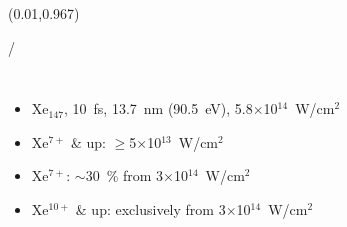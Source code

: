 \documentclass{beamer}
\makeatletter
\newcommand{\framenumber}{
\begin{textblock}{0}(0.01,0.967)
\begin{scriptsize}
{\color{gray}\insertframenumber/\inserttotalframenumber}
\end{scriptsize}
\end{textblock}
}
\makeatother
\begin{document}
\begin{frame}{}
\begin{columns}
\begin{center}
\begin{overlayarea}{\textwidth}{\textheight}
            \end{overlayarea}
        \end{center}

   \end{columns}
\end{frame}
\begin{frame}{}\framenumber{}
   \begin{columns}
       \begin{itemize}
           \item Xe$_{147}$, 10~fs, 13.7~nm (90.5~eV), 5.8$\times$10$^{14}$~W/cm$^2$
           \item<3-> Xe$^{7+}$ \& up: $\ge$5$\times$10$^{13}$~W/cm$^2$
           \item<3-> Xe$^{7+}$: $\sim$30~\% from 3$\times$10$^{14}$~W/cm$^2$
           \item<3-> Xe$^{10+}$ \& up: exclusively from 3$\times$10$^{14}$~W/cm$^2$
       \end{itemize}


        \begin{center}
        \end{center}

   \end{columns}
\end{frame}
\end{document}
